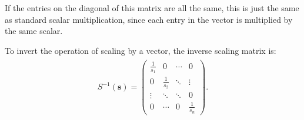 \documentclass[letterpaper,10pt,english]{jupyterBook}
\begin{document}
\sphinxAtStartPar
If the entries on the diagonal of this matrix are all the same, this is just the same as standard scalar multiplication, since each entry in the vector is multiplied by the same scalar.

\sphinxAtStartPar
To invert the operation of scaling by a vector, the inverse scaling matrix is:
\begin{equation*}
\begin{split} \begin{align*}
    S^{-1}(\mathbf{s}) =
    \begin{pmatrix}
        \frac{1}{s_1} & 0 & \cdots & 0 \\
        0 & \frac{1}{s_2} & \ddots & \vdots \\
        \vdots & \ddots & \ddots & 0 \\
        0 & \cdots & 0 & \frac{1}{s_n}
        \end{pmatrix}.
\end{align*} \end{split}
\end{equation*}\label{_pages/6.3_Rotation_reflection_and_translation:scaling-example}
\end{document}

